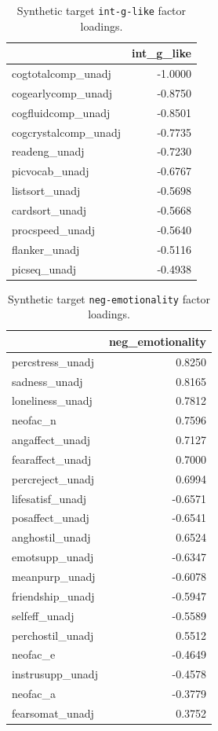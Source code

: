 \documentclass{article}
\begin{document}
\begin{table}[H]
\centering
\begin{tabular}{lr}
\toprule
 & int\_g\_like \\
\midrule
cogtotalcomp\_unadj & -1.0000 \\
cogearlycomp\_unadj & -0.8750 \\
cogfluidcomp\_unadj & -0.8501 \\
cogcrystalcomp\_unadj & -0.7735 \\
readeng\_unadj & -0.7230 \\
picvocab\_unadj & -0.6767 \\
listsort\_unadj & -0.5698 \\
cardsort\_unadj & -0.5668 \\
procspeed\_unadj & -0.5640 \\
flanker\_unadj & -0.5116 \\
picseq\_unadj & -0.4938 \\
\bottomrule
\end{tabular}

\footnotesize
\caption{Synthetic target \texttt{int-g-like} factor loadings.}
\normalsize
\label{tab:int-g-like}
\end{table}


\begin{table}[H]
\centering
\begin{tabular}{lr}
\toprule
 & neg\_emotionality \\
\midrule
percstress\_unadj & 0.8250 \\
sadness\_unadj & 0.8165 \\
loneliness\_unadj & 0.7812 \\
neofac\_n & 0.7596 \\
angaffect\_unadj & 0.7127 \\
fearaffect\_unadj & 0.7000 \\
percreject\_unadj & 0.6994 \\
lifesatisf\_unadj & -0.6571 \\
posaffect\_unadj & -0.6541 \\
anghostil\_unadj & 0.6524 \\
emotsupp\_unadj & -0.6347 \\
meanpurp\_unadj & -0.6078 \\
friendship\_unadj & -0.5947 \\
selfeff\_unadj & -0.5589 \\
perchostil\_unadj & 0.5512 \\
neofac\_e & -0.4649 \\
instrusupp\_unadj & -0.4578 \\
neofac\_a & -0.3779 \\
fearsomat\_unadj & 0.3752 \\
\bottomrule
\end{tabular}

\footnotesize
\caption{Synthetic target \texttt{neg-emotionality} factor loadings.}
\normalsize
\label{tab:neg-emotionality}
\end{table}
\end{document}
